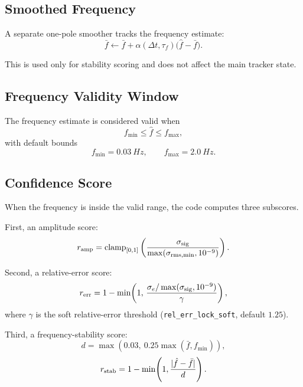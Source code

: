 \documentclass[conference]{IEEEtran}
\begin{document}
\subsection{Smoothed Frequency}

A separate one-pole smoother tracks the frequency estimate:
\begin{equation}
  \bar f \leftarrow \bar f
  + \alpha(\Delta t,\tau_f)\bigl(\hat f - \bar f\bigr).
\end{equation}

This is used only for stability scoring and does not affect the main tracker
state.

\subsection{Frequency Validity Window}

The frequency estimate is considered valid when
\begin{equation}
  f_{\min} \le \hat f \le f_{\max},
\end{equation}
with default bounds
\begin{equation}
  f_{\min} = \SI{0.03}{Hz}, \qquad
  f_{\max} = \SI{2.0}{Hz}.
\end{equation}

\subsection{Confidence Score}

When the frequency is inside the valid range, the code computes three
subscores.

First, an amplitude score:
\begin{equation}
  r_{\rm amp} =
  \operatorname{clamp}_{[0,1]}
  \left(
    \frac{\sigma_{\rm sig}}
         {\max(\sigma_{\rm rms,min},10^{-9})}
  \right).
\end{equation}

Second, a relative-error score:
\begin{equation}
  r_{\rm err} =
  1-\min\!\left(
    1,\,
    \frac{\sigma_e / \max(\sigma_{\rm sig},10^{-9})}
         {\gamma}
  \right),
\end{equation}
where $\gamma$ is the soft relative-error threshold
(\texttt{rel\_err\_lock\_soft}, default $1.25$).

Third, a frequency-stability score:
\begin{equation}
  d = \max\!\left(0.03,\ 0.25\max(\bar f,f_{\min})\right),
\end{equation}
\begin{equation}
  r_{\rm stab} =
  1-\min\!\left(1,\frac{|\hat f-\bar f|}{d}\right).
\end{equation}
\end{document}
